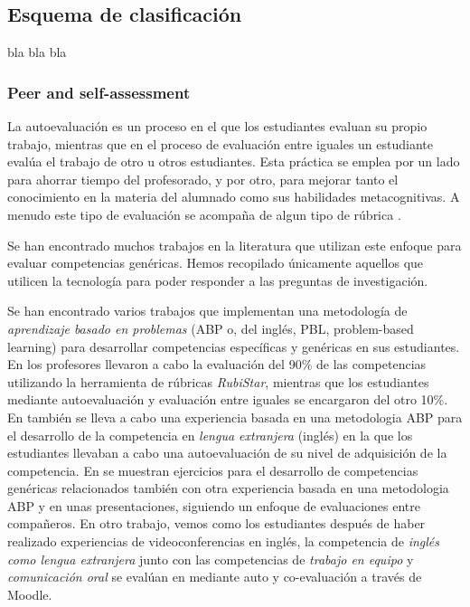 \subsection{Esquema de clasificación}

bla bla bla

\subsubsection{Peer and self-assessment}

La autoevaluación es un proceso en el que los estudiantes evaluan su propio trabajo, mientras que  en el proceso de evaluación entre iguales un estudiante evalúa el trabajo de otro u otros estudiantes. Esta práctica se emplea por un lado para ahorrar tiempo del profesorado, y por otro, para mejorar tanto el conocimiento en la materia del alumnado como sus habilidades metacognitivas. A menudo este tipo de evaluación se acompaña de algun tipo de rúbrica \cite{malehorn1994ten}.

Se han encontrado muchos trabajos en la literatura que utilizan este enfoque para evaluar competencias genéricas. Hemos recopilado únicamente aquellos que utilicen la tecnología para poder responder a las preguntas de investigación. 

Se han encontrado varios trabajos que implementan una metodología de \emph{aprendizaje basado en problemas} (ABP o, del inglés, PBL, problem-based learning) para desarrollar competencias específicas y genéricas en sus estudiantes. En \cite{lasa2013problem} los profesores llevaron a cabo la evaluación del 90\% de las competencias utilizando la herramienta de rúbricas \emph{RubiStar}, mientras que los estudiantes mediante autoevaluación y evaluación entre iguales se encargaron del otro 10\%. En \cite{renau2010teaching} también se lleva a cabo una experiencia basada en una metodologia ABP para el desarrollo de la competencia en \emph{lengua extranjera} (inglés) en la que los estudiantes llevaban a cabo una autoevaluación de su nivel de adquisición de la competencia. En \cite{johnson2002encouraging} se muestran ejercicios para el desarrollo de competencias genéricas relacionados también con otra experiencia basada en una metodologia ABP y en unas presentaciones, siguiendo un enfoque de evaluaciones entre compañeros. En otro trabajo, vemos como los estudiantes después de haber realizado experiencias de videoconferencias en inglés, la competencia de \emph{inglés como lengua extranjera} junto con las competencias de \emph{trabajo en equipo} y \emph{comunicación oral} se evalúan en \cite{masip2013self} mediante auto y co-evaluación a través de Moodle.

